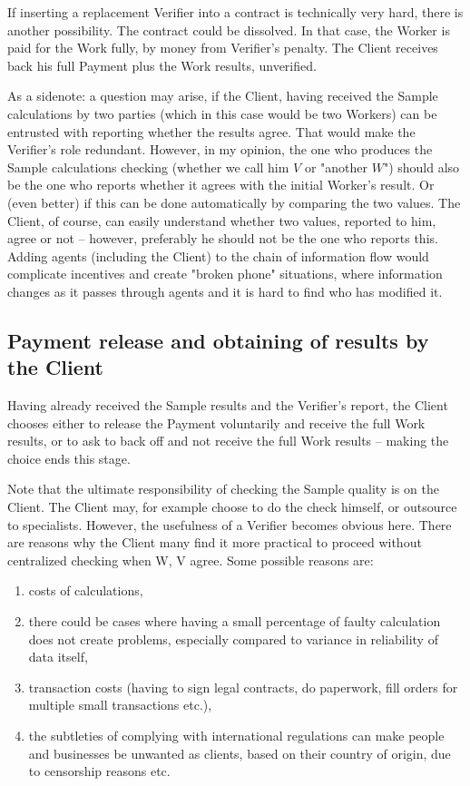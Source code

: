 \documentclass[conference]{IEEEtran}
\providecommand{\tightlist}{%
  \setlength{\itemsep}{0pt}%
  \setlength{\parskip}{0pt}%
  \setlength{\topsep}{0pt}}
\begin{document}
If inserting a replacement Verifier into a contract is technically very hard, there is another possibility. The contract could be dissolved. In that case, the Worker is paid for the Work fully, by money from Verifier's penalty. The Client receives back his full Payment plus the Work results, unverified. 

As a sidenote: a question may arise, if the Client, having received the Sample calculations by two parties (which in this case would be two Workers) can be entrusted with reporting whether the results agree. That would make the Verifier's role redundant. However, in my opinion, the one who produces the Sample calculations checking (whether we call him $V$ or "another $W$") should also be the one who reports whether it agrees with the initial Worker's result. Or (even better) if this can be done automatically by comparing the two values. The Client, of course, can easily understand whether two values, reported to him, agree or not – however, preferably he should not be the one who reports this. Adding agents (including the Client) to the chain of information flow would complicate incentives and create "broken phone" situations, where information changes as it passes through agents and it is hard to find who has modified it.

\subsection{Payment release and obtaining of results by the Client}
\label{results}

Having already received the Sample results and the Verifier's report, the Client chooses either to release the Payment voluntarily and receive the full Work results, or to ask to back off and not receive the full Work results – making the choice ends this stage. 

Note that the ultimate responsibility of checking the Sample quality is on the Client. The Client may, for example choose to do the check himself, or outsource to specialists. However, the usefulness of a Verifier becomes obvious here. There are reasons why the Client many find it more practical to proceed without centralized checking when W, V agree. Some possible reasons are: 
\renewcommand{\labelenumi}{(\alph{enumi})}
\begin{enumerate}[topsep=0pt]
    \tightlist
    \item costs of calculations,
    \item there could be cases where having a small percentage of faulty calculation does not create problems, especially compared to variance in reliability of data itself,
    \item transaction costs (having to sign legal contracts, do paperwork, fill orders for multiple small transactions etc.),
    \item the subtleties of complying with international regulations can make people and businesses be unwanted as clients, based on their country of origin, due to censorship reasons etc. 
\end{enumerate}
\end{document}

